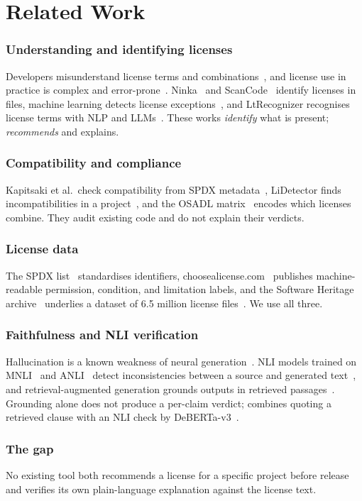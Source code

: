 \section{Related Work}
\label{s:related}

\subsubsection{Understanding and identifying licenses}
Developers misunderstand license terms and combinations~\cite{almeida2017developers}, and license use in practice is complex and error-prone~\cite{wu2024license}. Ninka~\cite{german2010ninka} and ScanCode~\cite{scancode} identify licenses in files, machine learning detects license exceptions~\cite{vendome2017exceptions}, and LtRecognizer recognises license terms with NLP and LLMs~\cite{liu2027ltrecognizer}. These works \emph{identify} what is present; \sys{} \emph{recommends} and explains.

\subsubsection{Compatibility and compliance}
Kapitsaki et al.\ check compatibility from SPDX metadata~\cite{kapitsaki2017spdx}, LiDetector finds incompatibilities in a project~\cite{xu2023lidetector}, and the OSADL matrix~\cite{osadl} encodes which licenses combine. They audit existing code and do not explain their verdicts.

\subsubsection{License data}
The SPDX list~\cite{spdx} standardises identifiers, choosealicense.com~\cite{choosealicense} publishes machine-readable permission, condition, and limitation labels, and the Software Heritage archive~\cite{dicosmo2017swh} underlies a dataset of 6.5 million license files~\cite{zacchiroli2022dataset}. We use all three.

\subsubsection{Faithfulness and NLI verification}
Hallucination is a known weakness of neural generation~\cite{ji2023hallucination,maynez2020faithfulness}. NLI models trained on MNLI~\cite{williams2018mnli} and ANLI~\cite{nie2020anli} detect inconsistencies between a source and generated text~\cite{laban2022summac,honovich2022true}, and retrieval-augmented generation grounds outputs in retrieved passages~\cite{lewis2020rag}. Grounding alone does not produce a per-claim verdict; \sys{} combines quoting a retrieved clause with an NLI check by DeBERTa-v3~\cite{he2023debertav3}.

\subsubsection{The gap}
No existing tool both recommends a license for a specific project before release and verifies its own plain-language explanation against the license text.
